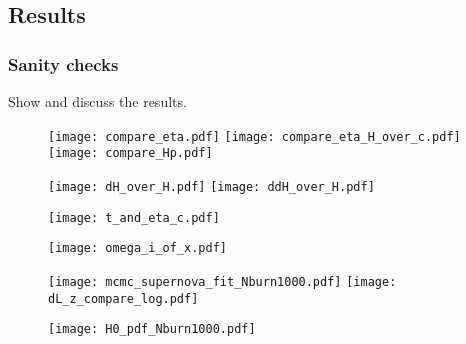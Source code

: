 

\subsection{Results}\label{M1:results}
\subsubsection{Sanity checks}
Show and discuss the results.



\begin{figure}
    \texttt{[image: compare\_eta.pdf]}
    \texttt{[image: compare\_eta\_H\_over\_c.pdf]}
    \texttt{[image: compare\_Hp.pdf]}
\end{figure}

\begin{figure}[ht!]
    \texttt{[image: dH\_over\_H.pdf]}
    \texttt{[image: ddH\_over\_H.pdf]}
\end{figure}

\begin{figure}[ht!]
    \texttt{[image: t\_and\_eta\_c.pdf]}
\end{figure}


\begin{figure}[ht!]
    \texttt{[image: omega\_i\_of\_x.pdf]}
\end{figure}

\begin{figure}[ht!]
    \texttt{[image: mcmc\_supernova\_fit\_Nburn1000.pdf]}
    \texttt{[image: dL\_z\_compare\_log.pdf]}
\end{figure}

\begin{figure}[ht!]
    \texttt{[image: H0\_pdf\_Nburn1000.pdf]}    
\end{figure}